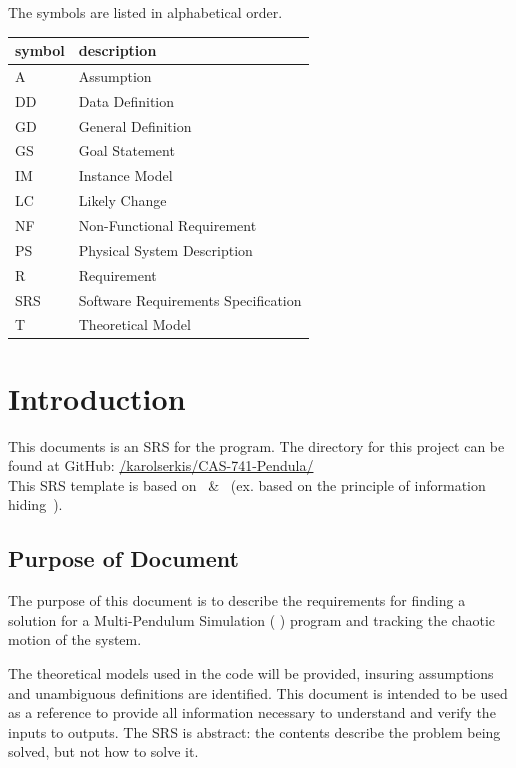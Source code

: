 \documentclass[12pt]{article}
\begin{document}
The symbols are listed in alphabetical order.\\

\renewcommand{\arraystretch}{1.2}
\begin{tabular}{l l} 
  \toprule		
  \textbf{symbol} & \textbf{description}\\
  \midrule 
  A & Assumption\\
  DD & Data Definition\\
  GD & General Definition\\
  GS & Goal Statement\\
  IM & Instance Model\\
  LC & Likely Change\\
  NF & Non-Functional Requirement\\
  PS & Physical System Description\\
  R & Requirement\\
  SRS & Software Requirements Specification\\
  T & Theoretical Model\\
  \bottomrule
\end{tabular}

\newpage


\setcounter{secnumdepth}{3}

\section{Introduction}

This documents is an SRS for the \progname program. The
directory for this project can be found at GitHub:
\href{https://github.com/karolserkis/CAS-741-Pendula/}
{/karolserkis/CAS-741-Pendula/}\\
This SRS template is based on~\citep{SmithAndLai2005} \&~\citep{SmithEtAl2007}
(ex. based on the principle of information hiding~\citep{Parnas1972a}).

\subsection{Purpose of Document}
The purpose of this document is to describe the requirements for finding a 
solution for a Multi-Pendulum Simulation ( \progname) program and tracking the 
chaotic motion of the system. 

The theoretical models used in the \progname code will be provided, insuring
assumptions and unambiguous definitions are identified. This document 
is intended to be used as a reference to provide all information necessary to 
understand and verify the inputs to outputs. The SRS is abstract: the contents 
describe the problem being solved, but not how to solve it.
\end{document}
